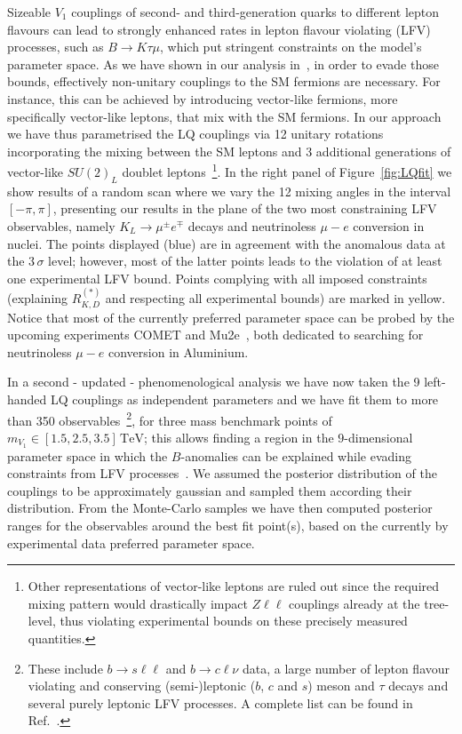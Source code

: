 \documentclass[a4paper,11pt]{article}
\def\bsll{b \to s\ell\ell}
\def\bclnu{b \to c\ell\nu}
\begin{document}
Sizeable $V_1$ couplings of second- and third-generation quarks to different lepton flavours can lead to strongly enhanced rates in lepton flavour violating (LFV) processes, such as $B\to K\tau\mu$, which put stringent constraints on the model's parameter space.
As we have shown in our analysis in~\cite{Hati:2019ufv}, in order to evade those bounds, effectively non-unitary couplings to the SM fermions are necessary. For instance, this can be achieved by introducing vector-like fermions, more specifically vector-like leptons, that mix with the SM fermions.
In our approach we have thus parametrised the LQ couplings via 12 unitary rotations incorporating the mixing between the SM leptons and 3 additional generations of vector-like $SU(2)_L$ doublet leptons~\footnote{Other representations of vector-like leptons are 
ruled out since the required mixing pattern would drastically impact $Z\ell\ell$ couplings already at the tree-level, thus violating experimental bounds on these precisely measured quantities.}.
In the right panel of Figure~\ref{fig:LQfit} we show results of a random scan where we vary the 12 mixing angles in the interval $[-\pi,\pi]$, presenting our results in the plane of the two most constraining LFV observables, namely $K_L\to \mu^\pm e^\mp$ decays and neutrinoless $\mu-e$ conversion in nuclei. The points displayed (blue) are in agreement with the anomalous data at the $3\,\sigma$ level; however, most of the latter points leads to the violation of at least one experimental LFV bound. Points complying with all imposed constraints (explaining $R_{K,D}^{(*)}$ and respecting all experimental bounds) are marked in yellow. Notice that most of the currently preferred parameter space can be probed by the upcoming experiments COMET and Mu2e~\cite{mutoe}, both dedicated to searching for neutrinoless $\mu-e$ conversion in Aluminium.

In a second - updated - phenomenological analysis we have now taken the 9 left-handed LQ couplings as independent parameters and we have fit them to more than 350 observables~\footnote{These include $\bsll$ and $\bclnu$ data, a large number of lepton flavour violating and conserving (semi-)leptonic ($b$, $c$ and $s$) meson and $\tau$ decays and several purely leptonic LFV processes. A complete list can be found in Ref.~\cite{LQ2020}.}, for three mass benchmark points of $m_{V_1}\in[1.5, 2.5, 3.5]\,\mathrm{TeV}$; this allows finding a region in the $9$-dimensional parameter space in which the $B$-anomalies can be explained while evading constraints from LFV processes~\cite{LQ2020}.
We assumed the posterior distribution of the couplings to be approximately gaussian and sampled them according their distribution. From the Monte-Carlo samples we have then computed posterior ranges for the observables around the best fit point(s), based on the currently by experimental data preferred parameter space.
\end{document}
